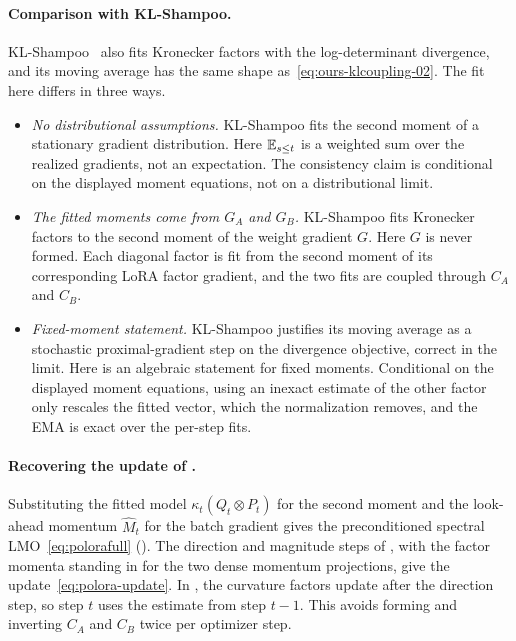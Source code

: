 \paragraph{Comparison with KL-Shampoo.} KL-Shampoo~\cite{klshampoo} also
fits Kronecker factors with the log-determinant divergence, and its moving
average has the same shape as~\eqref{eq:ours-klcoupling-02}. The fit here
differs in three ways.
\begin{itemize}[leftmargin=1.5em,itemsep=1pt,topsep=2pt]
  \item \emph{No distributional assumptions.} KL-Shampoo fits the second
  moment of a stationary gradient distribution. Here $\mathbb{E}_{s \leq t}$ is a
  weighted sum over the realized gradients, not an expectation. The
  consistency claim is conditional on the displayed moment equations, not
  on a distributional limit.
  \item \emph{The fitted moments come from $G_A$ and $G_B$.} KL-Shampoo
  fits Kronecker factors to the second moment of the weight gradient $G$.
  Here $G$ is never formed. Each diagonal factor is fit from the second
  moment of its corresponding LoRA factor gradient, and the two fits are
  coupled through $C_A$ and $C_B$.
  \item \emph{Fixed-moment statement.} KL-Shampoo
  justifies its moving average as a stochastic proximal-gradient step on
  the divergence objective, correct in the limit. Here
   is an algebraic statement for fixed moments.
  Conditional on the displayed moment equations, using an inexact estimate
  of the other factor only rescales the fitted vector, which the normalization
  removes, and the EMA is exact over the per-step fits.
\end{itemize}

\paragraph{Recovering the update of .} Substituting the
fitted model $\kappa_t(Q_t\otimes P_t)$ for the second moment and the
look-ahead momentum $\widehat M_t$ for the batch gradient gives the
preconditioned spectral LMO~\eqref{eq:polorafull}
(). The direction and magnitude steps of
, with the factor momenta standing in for the two
dense momentum projections, give the update~\eqref{eq:polora-update}. In
, the curvature factors update after the direction step, so
step $t$ uses the estimate from step $t-1$. This avoids forming and
inverting $C_A$ and $C_B$ twice per optimizer step.

